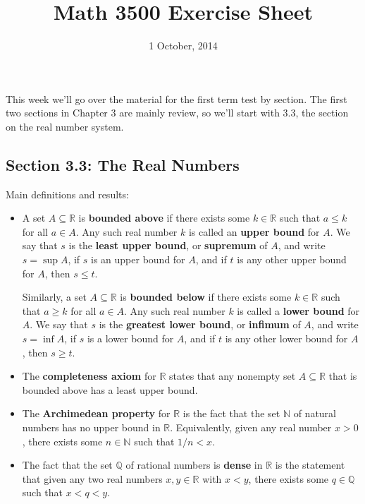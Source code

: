 \documentclass[letterpaper,12pt]{article}
\title{Math 3500 Exercise Sheet}
\date{1 October, 2014}
\newcommand{\N}{\mathbb{N}}
\newcommand{\Q}{\mathbb{Q}}
\newcommand{\R}{\mathbb{R}}
\begin{document}
\maketitle

This week we'll go over the material for the first term test by section. The first two sections in Chapter 3 are mainly review, so we'll start with 3.3, the section on the real number system.

\subsection*{Section 3.3: The Real Numbers}
Main definitions and results:
\begin{itemize}
 \item A set $A\subseteq \R$ is {\bf bounded above} if there exists some $k\in\R$ such that $a\leq k$ for all $a\in A$. Any such real number $k$ is called an {\bf upper bound} for $A$. We say that $s$ is the {\bf least upper bound}, or {\bf supremum} of $A$, and write $s = \sup A$, if $s$ is an upper bound for $A$, and if $t$ is any other upper bound for $A$, then $s\leq t$.

 Similarly, a set $A\subseteq \R$ is {\bf bounded below} if there exists some $k\in\R$ such that $a\geq k$ for all $a\in A$. Any such real number $k$ is called a {\bf lower bound} for $A$. We say that $s$ is the {\bf greatest lower bound}, or {\bf infimum} of $A$, and write $s = \inf A$, if $s$ is a lower bound for $A$, and if $t$ is any other lower bound for $A$, then $s\geq t$.
 \item The {\bf completeness axiom} for $\R$ states that any nonempty set $A\subseteq \R$ that is bounded above has a least upper bound.
 \item The {\bf Archimedean property} for $\R$ is the fact that the set $\N$ of natural numbers has no upper bound in $\R$. Equivalently, given any real number $x>0$, there exists some $n\in \N$ such that $1/n<x$.
 \item The fact that the set $\Q$ of rational numbers is {\bf dense} in $\R$ is the statement that given any two real numbers $x,y\in\R$ with $x<y$, there exists some $q\in\Q$ such that $x<q<y$.
\end{itemize}
\end{document}
